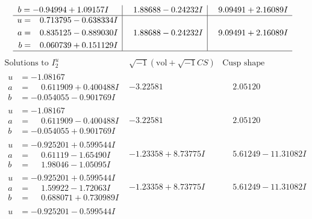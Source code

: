 \documentclass[1p]{elsarticle_modified}
\theoremstyle{definition}
\newcommand{\I}{\sqrt{-1}}
\begin{document}
$$\begin{array}{c|c|c}
\begin{aligned}
b &= -0.94994 + 1.09157 I\end{aligned}
 & \phantom{-}1.88688 - 0.24232 I & \phantom{-}9.09491 + 2.16089 I \\ \hline\begin{aligned}
u &= \phantom{-}0.713795 - 0.638334 I \\
a &= \phantom{-}0.835125 - 0.889030 I \\
b &= \phantom{-}0.060739 + 0.151129 I\end{aligned}
 & \phantom{-}1.88688 - 0.24232 I & \phantom{-}9.09491 + 2.16089 I\\
 \hline 
 \end{array}$$\newpage$$\begin{array}{c|c|c}  
\text{Solutions to }I^u_{2}& \I (\text{vol} + \sqrt{-1}CS) & \text{Cusp shape}\\
 \hline 
\begin{aligned}
u &= -1.08167\phantom{ +0.000000I} \\
a &= \phantom{-}0.611909 + 0.400488 I \\
b &= -0.054055 - 0.901769 I\end{aligned}
 & -3.22581\phantom{ +0.000000I} & \phantom{-}2.05120\phantom{ +0.000000I} \\ \hline\begin{aligned}
u &= -1.08167\phantom{ +0.000000I} \\
a &= \phantom{-}0.611909 - 0.400488 I \\
b &= -0.054055 + 0.901769 I\end{aligned}
 & -3.22581\phantom{ +0.000000I} & \phantom{-}2.05120\phantom{ +0.000000I} \\ \hline\begin{aligned}
u &= -0.925201 + 0.599544 I \\
a &= \phantom{-}0.61119 - 1.65490 I \\
b &= \phantom{-}1.98046 - 1.05095 I\end{aligned}
 & -1.23358 + 8.73775 I & \phantom{-}5.61249 - 11.31082 I \\ \hline\begin{aligned}
u &= -0.925201 + 0.599544 I \\
a &= \phantom{-}1.59922 - 1.72063 I \\
b &= \phantom{-}0.688071 + 0.730989 I\end{aligned}
 & -1.23358 + 8.73775 I & \phantom{-}5.61249 - 11.31082 I \\ \hline\begin{aligned}
u &= -0.925201 - 0.599544 I \\

\end{aligned}
\end{array}$$
\end{document}
